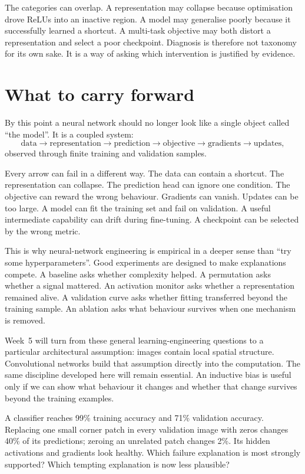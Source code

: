 The categories can overlap. A representation may collapse because optimisation drove ReLUs into an inactive region. A model may generalise poorly because it successfully learned a shortcut. A multi-task objective may both distort a representation and select a poor checkpoint. Diagnosis is therefore not taxonomy for its own sake. It is a way of asking which intervention is justified by evidence.

\section{What to carry forward}

By this point a neural network should no longer look like a single object called ``the model''. It is a coupled system:
\[
\text{data}
\rightarrow \text{representation}
\rightarrow \text{prediction}
\rightarrow \text{objective}
\rightarrow \text{gradients}
\rightarrow \text{updates},
\]
observed through finite training and validation samples.

Every arrow can fail in a different way. The data can contain a shortcut. The representation can collapse. The prediction head can ignore one condition. The objective can reward the wrong behaviour. Gradients can vanish. Updates can be too large. A model can fit the training set and fail on validation. A useful intermediate capability can drift during fine-tuning. A checkpoint can be selected by the wrong metric.

This is why neural-network engineering is empirical in a deeper sense than ``try some hyperparameters''. Good experiments are designed to make explanations compete. A baseline asks whether complexity helped. A permutation asks whether a signal mattered. An activation monitor asks whether a representation remained alive. A validation curve asks whether fitting transferred beyond the training sample. An ablation asks what behaviour survives when one mechanism is removed.

Week~5 will turn from these general learning-engineering questions to a particular architectural assumption: images contain local spatial structure. Convolutional networks build that assumption directly into the computation. The same discipline developed here will remain essential. An inductive bias is useful only if we can show what behaviour it changes and whether that change survives beyond the training examples.

\begin{checkpointbox}
A classifier reaches 99\% training accuracy and 71\% validation accuracy. Replacing one small corner patch in every validation image with zeros changes 40\% of its predictions; zeroing an unrelated patch changes 2\%. Its hidden activations and gradients look healthy. Which failure explanation is most strongly supported? Which tempting explanation is now less plausible?
\end{checkpointbox}
